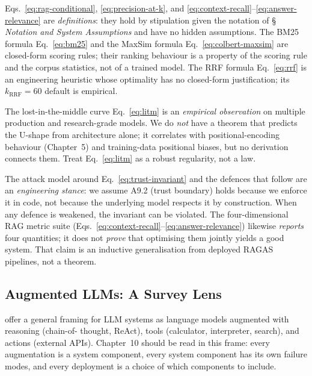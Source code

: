\begin{provedassumed}
Eqs.~\eqref{eq:rag-conditional}, \eqref{eq:precision-at-k}, and
\eqref{eq:context-recall}--\eqref{eq:answer-relevance} are
\emph{definitions}: they hold by stipulation given the notation of
\S\,\emph{Notation and System Assumptions} and have no hidden
assumptions. The BM25 formula Eq.~\eqref{eq:bm25} and the MaxSim
formula Eq.~\eqref{eq:colbert-maxsim} are closed-form scoring
rules; their ranking behaviour is a property of the scoring rule
and the corpus statistics, not of a trained model. The RRF formula
Eq.~\eqref{eq:rrf} is an engineering heuristic whose optimality
has no closed-form justification; its $k_\mathrm{RRF}=60$ default
is empirical.

The lost-in-the-middle curve Eq.~\eqref{eq:litm} is an
\emph{empirical observation} on multiple production and
research-grade models. We do \emph{not} have a theorem that
predicts the U-shape from architecture alone; it correlates with
positional-encoding behaviour (Chapter~5) and training-data
positional biases, but no derivation connects them. Treat
Eq.~\eqref{eq:litm} as a robust regularity, not a law.

The attack model around Eq.~\eqref{eq:trust-invariant} and the
defences that follow are an \emph{engineering stance}: we assume
A9.2 (trust boundary) holds because we enforce it in code, not
because the underlying model respects it by construction. When any
defence is weakened, the invariant can be violated. The
four-dimensional RAG metric suite
(Eqs.~\eqref{eq:context-recall}--\eqref{eq:answer-relevance})
likewise \emph{reports} four quantities; it does not \emph{prove}
that optimising them jointly yields a good system. That claim is
an inductive generalisation from deployed RAGAS pipelines, not a
theorem.
\end{provedassumed}

\subsection{Augmented LLMs: A Survey Lens}

\citet{mialon2023augmented} offer a general framing for LLM
systems as language models augmented with reasoning (chain-of-
thought, ReAct), tools (calculator, interpreter, search), and
actions (external APIs). Chapter~10 should be read in this frame:
every augmentation is a system component, every system component
has its own failure modes, and every deployment is a choice of
which components to include.

